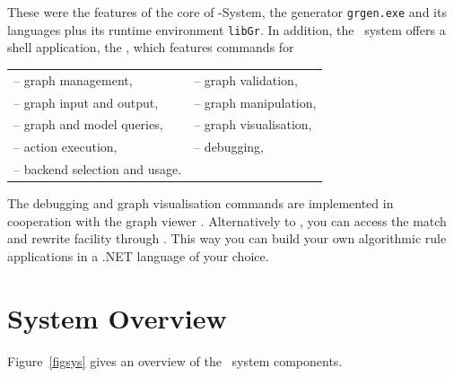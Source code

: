 \noindent These were the features of the core of \GrG-System, 
the generator \texttt{grgen.exe} and its languages plus its runtime environment \texttt{libGr}.
In addition, the \GrG\ system offers a shell application, the \GrShell, 
which features commands for
\begin{table}[htbp]
    \begin{tabularx}{\linewidth}{ll}
		\hspace{12mm}-- graph management,\hspace{3cm} & -- graph validation,\\[5pt]
		\hspace{12mm}-- graph input and output, & -- graph manipulation,\\[5pt]
		\hspace{12mm}-- graph and model queries, & -- graph visualisation,\\[5pt]
		\hspace{12mm}-- action execution, & -- debugging,\\[5pt]
		\hspace{12mm}-- backend selection and usage. 
    \end{tabularx}    
    \label{tbl:overview:shellcommands}
\end{table}

The debugging and graph visualisation commands are implemented in cooperation with the graph viewer \yComp.
Alternatively to \GrShell, you can access the match and rewrite facility through \LibGr. 
This way you can build your own algorithmic rule applications in a .NET language of your choice. 


\section{System Overview}

Figure~\ref{figsys} gives an overview of the \GrG\ system components. 

